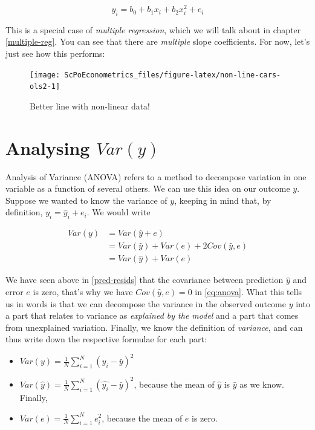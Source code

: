 \documentclass[]{book}
\providecommand{\tightlist}{%
  \setlength{\itemsep}{0pt}\setlength{\parskip}{0pt}}
\theoremstyle{definition}
\theoremstyle{definition}
\theoremstyle{definition}
\theoremstyle{remark}
\begin{document}
\[
y_i = b_0 + b_1 x_i + b_2 x_i^2 + e_i \label{eq:abline2}
\]

This is a special case of \emph{multiple regression}, which we will talk
about in chapter \ref{multiple-reg}. You can see that there are
\emph{multiple} slope coefficients. For now, let's just see how this
performs:

\begin{figure}

{\centering \texttt{[image: ScPoEconometrics\_files/figure-latex/non-line-cars-ols2-1]} 

}

\caption{Better line with non-linear data!}\label{fig:non-line-cars-ols2}
\end{figure}

\section{\texorpdfstring{Analysing
\(Var(y)\)}{Analysing Var(y)}}\label{analysing-vary}

Analysis of Variance (ANOVA) refers to a method to decompose variation
in one variable as a function of several others. We can use this idea on
our outcome \(y\). Suppose we wanted to know the variance of \(y\),
keeping in mind that, by definition, \(y_i = \hat{y}_i + e_i\). We would
write

\begin{align}
Var(y) &= Var(\hat{y} + e)\\
 &= Var(\hat{y}) + Var(e) + 2 Cov(\hat{y},e)\\
 &= Var(\hat{y}) + Var(e) \label{eq:anova}
\end{align}

We have seen above in \ref{pred-resids} that the covariance between
prediction \(\hat{y}\) and error \(e\) is zero, that's why we have
\(Cov(\hat{y},e)=0\) in \eqref{eq:anova}. What this tells us in words is
that we can decompose the variance in the observed outcome \(y\) into a
part that relates to variance as \emph{explained by the model} and a
part that comes from unexplained variation. Finally, we know the
definition of \emph{variance}, and can thus write down the respective
formulae for each part:

\begin{itemize}
\tightlist
\item
  \(Var(y) = \frac{1}{N}\sum_{i=1}^N (y_i - \bar{y})^2\)
\item
  \(Var(\hat{y}) = \frac{1}{N}\sum_{i=1}^N (\hat{y_i} - \bar{y})^2\),
  because the mean of \(\hat{y}\) is \(\bar{y}\) as we know. Finally,
\item
  \(Var(e) = \frac{1}{N}\sum_{i=1}^N e_i^2\), because the mean of \(e\)
  is zero.
\end{itemize}
\end{document}
